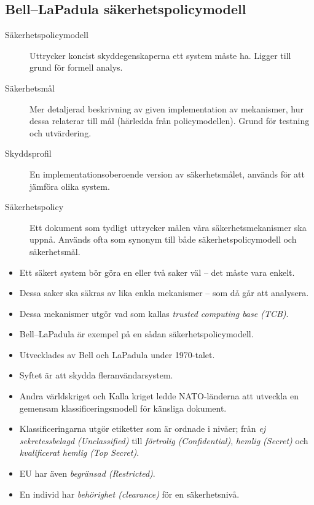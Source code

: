 \documentclass{beamer}
\begin{document}
\subsection{Bell--LaPadula säkerhetspolicymodell}
\begin{frame}{\insertsubsectionhead}
  \begin{description}
    \item[Säkerhetspolicymodell] Uttrycker koncist skyddegenskaperna ett system 
      måste ha.
      Ligger till grund för formell analys.
    \item[Säkerhetsmål] Mer detaljerad beskrivning av given implementation av 
      mekanismer, hur dessa relaterar till mål (härledda från policymodellen).
      Grund för testning och utvärdering.
    \item[Skyddsprofil] En implementationsoberoende version av säkerhetsmålet, 
      används för att jämföra olika system.
    \item[Säkerhetspolicy] Ett dokument som tydligt uttrycker målen våra 
      säkerhetsmekanismer ska uppnå.
      Används ofta som synonym till både säkerhetspolicymodell och 
      säkerhetsmål.
  \end{description}
\end{frame}
\begin{frame}{\insertsubsectionhead}
  \begin{itemize}
    \item Ett säkert system bör göra en eller två saker väl -- det måste vara 
      enkelt.
    \item Dessa saker ska säkras av lika enkla mekanismer -- som då går att 
      analysera.
    \item Dessa mekanismer utgör vad som kallas \emph{trusted computing base 
      (TCB)}.
    \item Bell--LaPadula är exempel på en sådan säkerhetspolicymodell.
    \item Utvecklades av Bell och LaPadula under 1970-talet.
    \item Syftet är att skydda fleranvändarsystem.
  \end{itemize}
\end{frame}
\begin{frame}{\insertsubsectionhead}
  \begin{itemize}
    \item Andra världskriget och Kalla kriget ledde NATO-länderna att utveckla 
      en gemensam klassificeringsmodell för känsliga dokument.
    \item Klassificeringarna utgör etiketter som är ordnade i nivåer; från 
      \emph{ej sekretessbelagd (Unclassified)} till \emph{förtrolig 
      (Confidential)}, \emph{hemlig (Secret)} och \emph{kvalificerat hemlig 
      (Top Secret)}.
    \item EU har även \emph{begränsad (Restricted)}.
    \item En individ har \emph{behörighet (clearance)} för en säkerhetsnivå.
  \end{itemize}
\end{frame}
\end{document}
